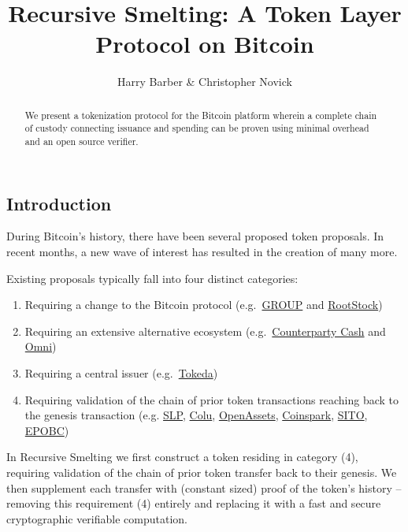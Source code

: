 \documentclass[9pt,oneside]{amsart}
\title{Recursive Smelting: A Token Layer Protocol on Bitcoin}
\author{Harry Barber \& Christopher Novick}
\begin{document}
\begin{abstract}
    We present a tokenization protocol for the Bitcoin platform wherein a complete chain of custody connecting issuance and spending can be proven using minimal overhead and an open source verifier.
\end{abstract}
\maketitle
\begin{multicols}{2}
	

\section{Introduction}
During Bitcoin's history, there have been several proposed token proposals. In recent months, a new wave of interest has resulted in the creation of many more. 

Existing proposals typically fall into four distinct categories: \begin{enumerate}
    \item Requiring a change to the Bitcoin protocol (e.g.\ \href{https://docs.google.com/document/d/1X-yrqBJNj6oGPku49krZqTMGNNEWnUJBRFjX7fJXvTs}{GROUP} and \href{https://en.wikipedia.org/wiki/RootStock}{RootStock})
    \item Requiring an extensive alternative ecosystem (e.g.\ \href{https://counterparty.io/docs/protocol_specification/}{Counterparty Cash} and \href{https://github.com/OmniLayer/spec}{Omni})
    \item Requiring a central issuer (e.g.\ \href{http://media.lokad.com/bitcoin/tokeda-2018-04-30.pdf}{Tokeda})
    \item Requiring validation of the chain of prior token transactions reaching back to the genesis transaction (e.g. \href{https://github.com/simpleledger/simple-ledger-protocol}{SLP}, \href{https://github.com/Colored-Coins/Colored-Coins-Protocol-Specification}{Colu}, \href{https://github.com/OpenAssets/open-assets-protocol/blob/master/specification.mediawiki}{OpenAssets}, \href{http://coinspark.org/}{Coinspark}, \href{https://github.com/awemany/sito}{SITO}, \href{https://github.com/chromaway/ngcccbase/wiki/EPOBC_simple}{EPOBC})
\end{enumerate}

In Recursive Smelting we first construct a token residing in category (4), requiring validation of the chain of prior token transfer back to their genesis. We then supplement each transfer with (constant sized) proof of the token's history -- removing this requirement (4) entirely and replacing it with a fast and secure cryptographic verifiable computation.


\end{multicols}
\end{document}
